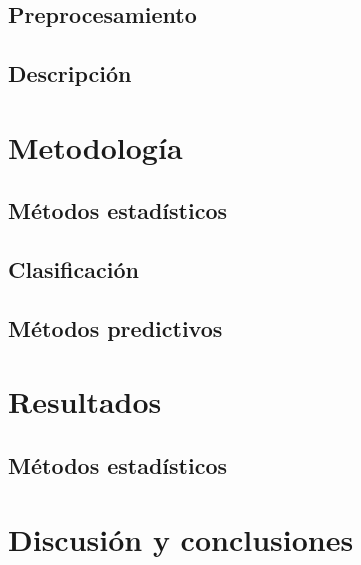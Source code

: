 \documentclass[colorinlistoftodos]{article}
\begin{document}
\subsection{Preprocesamiento}

\subsection{Descripción}


\section{Metodología}
\subsection{Métodos estadísticos}

\subsection{Clasificación}
\subsection{Métodos predictivos}



\section{Resultados}
\subsection{Métodos estadísticos}

\section{Discusión y conclusiones}




\listoftodos%
\end{document}
